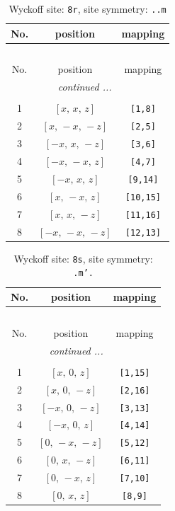 \documentclass[fleqn,8pt]{jsarticle}
\begin{document}
\begin{longtable}{ccc}
\caption{Wyckoff site: {\tt 8r}, site symmetry: {\tt ..m}}
 \\
 \hline \hline
No. & position & mapping \\ \hline \endfirsthead

\multicolumn{2}{l}{\tablename\ \thetable{}} \\
 \hline \hline
No. & position & mapping \\ \hline \endhead

 \hline \hline
\multicolumn{2}{r}{\footnotesize\it continued ...} \\ \endfoot

 \hline \hline
\multicolumn{2}{r}{} \\ \endlastfoot

1 & $\left[ x,\, x,\, z \right]$ & {\tt [1,8]} \\ \hline
2 & $\left[ x,\, - x,\, - z \right]$ & {\tt [2,5]} \\ \hline
3 & $\left[ - x,\, x,\, - z \right]$ & {\tt [3,6]} \\ \hline
4 & $\left[ - x,\, - x,\, z \right]$ & {\tt [4,7]} \\ \hline
5 & $\left[ - x,\, x,\, z \right]$ & {\tt [9,14]} \\ \hline
6 & $\left[ x,\, - x,\, z \right]$ & {\tt [10,15]} \\ \hline
7 & $\left[ x,\, x,\, - z \right]$ & {\tt [11,16]} \\ \hline
8 & $\left[ - x,\, - x,\, - z \right]$ & {\tt [12,13]} \\
\end{longtable}
\renewcommand{\arraystretch}{1.2}
\begin{longtable}{ccc}
\caption{Wyckoff site: {\tt 8s}, site symmetry: {\tt .m'.}}
 \\
 \hline \hline
No. & position & mapping \\ \hline \endfirsthead

\multicolumn{2}{l}{\tablename\ \thetable{}} \\
 \hline \hline
No. & position & mapping \\ \hline \endhead

 \hline \hline
\multicolumn{2}{r}{\footnotesize\it continued ...} \\ \endfoot

 \hline \hline
\multicolumn{2}{r}{} \\ \endlastfoot

1 & $\left[ x,\, 0,\, z \right]$ & {\tt [1,15]} \\ \hline
2 & $\left[ x,\, 0,\, - z \right]$ & {\tt [2,16]} \\ \hline
3 & $\left[ - x,\, 0,\, - z \right]$ & {\tt [3,13]} \\ \hline
4 & $\left[ - x,\, 0,\, z \right]$ & {\tt [4,14]} \\ \hline
5 & $\left[ 0,\, - x,\, - z \right]$ & {\tt [5,12]} \\ \hline
6 & $\left[ 0,\, x,\, - z \right]$ & {\tt [6,11]} \\ \hline
7 & $\left[ 0,\, - x,\, z \right]$ & {\tt [7,10]} \\ \hline
8 & $\left[ 0,\, x,\, z \right]$ & {\tt [8,9]} \\
\end{longtable}
\end{document}
